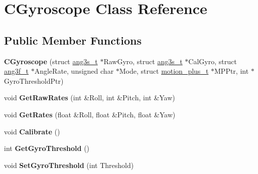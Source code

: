 \hypertarget{class_c_gyroscope}{\section{C\-Gyroscope Class Reference}
\label{class_c_gyroscope}
}
\subsection*{Public Member Functions}
\begin{DoxyCompactItemize}
\item 
\hypertarget{class_c_gyroscope_a065f7be42b432dbc9f57c0a3a9e2b88b}{{\bfseries C\-Gyroscope} (struct \hyperlink{structang3s__t}{ang3s\-\_\-t} $\ast$Raw\-Gyro, struct \hyperlink{structang3s__t}{ang3s\-\_\-t} $\ast$Cal\-Gyro, struct \hyperlink{structang3f__t}{ang3f\-\_\-t} $\ast$Angle\-Rate, unsigned char $\ast$Mode, struct \hyperlink{structmotion__plus__t}{motion\-\_\-plus\-\_\-t} $\ast$M\-P\-Ptr, int $\ast$Gyro\-Threshold\-Ptr)}\label{class_c_gyroscope_a065f7be42b432dbc9f57c0a3a9e2b88b}

\item 
\hypertarget{class_c_gyroscope_ab8d7db3bf44a8686d91e8fae5824af97}{void {\bfseries Get\-Raw\-Rates} (int \&Roll, int \&Pitch, int \&Yaw)}\label{class_c_gyroscope_ab8d7db3bf44a8686d91e8fae5824af97}

\item 
\hypertarget{class_c_gyroscope_a96b2a55ace21483305ef3f64bf415092}{void {\bfseries Get\-Rates} (float \&Roll, float \&Pitch, float \&Yaw)}\label{class_c_gyroscope_a96b2a55ace21483305ef3f64bf415092}

\item 
\hypertarget{class_c_gyroscope_a690a6e901390f2b57d0e48c03d00bc0f}{void {\bfseries Calibrate} ()}\label{class_c_gyroscope_a690a6e901390f2b57d0e48c03d00bc0f}

\item 
\hypertarget{class_c_gyroscope_a36ee104d7a2304c3b414cf48910c9fcb}{int {\bfseries Get\-Gyro\-Threshold} ()}\label{class_c_gyroscope_a36ee104d7a2304c3b414cf48910c9fcb}

\item 
\hypertarget{class_c_gyroscope_ace5399f8d1305a5ac8391fdaee52e32d}{void {\bfseries Set\-Gyro\-Threshold} (int Threshold)}\label{class_c_gyroscope_ace5399f8d1305a5ac8391fdaee52e32d}

\end{DoxyCompactItemize}
